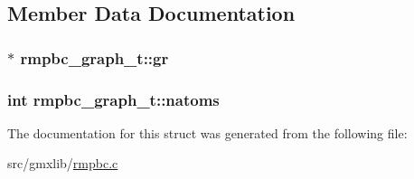 \subsection{\-Member \-Data \-Documentation}
\hypertarget{structrmpbc__graph__t_a6205865b1c2ee341a9eba20d84b773e3}{
\subsubsection[{gr}]{$\ast$ {\bf rmpbc\-\_\-graph\-\_\-t\-::gr}}}\label{structrmpbc__graph__t_a6205865b1c2ee341a9eba20d84b773e3}
\hypertarget{structrmpbc__graph__t_a4cc65ec71c4e56732cdeeac634ec92be}{
\subsubsection[{natoms}]{\setlength{\rightskip}{0pt plus 5cm}int {\bf rmpbc\-\_\-graph\-\_\-t\-::natoms}}}\label{structrmpbc__graph__t_a4cc65ec71c4e56732cdeeac634ec92be}


\-The documentation for this struct was generated from the following file\-:\begin{DoxyCompactItemize}
\item 
src/gmxlib/\hyperlink{rmpbc_8c}{rmpbc.\-c}\end{DoxyCompactItemize}
